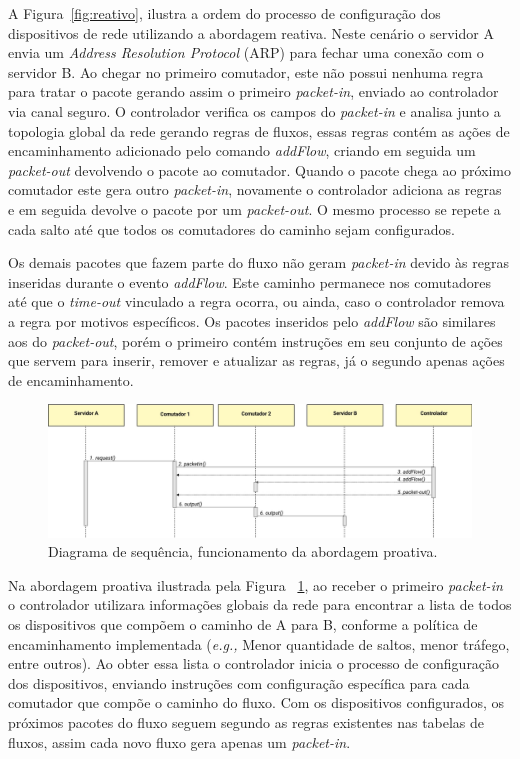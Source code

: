 A Figura~\ref{fig:reativo}, ilustra a ordem do processo de configuração dos dispositivos de rede utilizando a abordagem reativa. Neste cenário o servidor A envia um \emph{Address Resolution Protocol} (ARP) para fechar uma conexão com o servidor B. Ao chegar no primeiro comutador, este não possui nenhuma regra para tratar o pacote gerando assim o primeiro \textit{packet-in}, enviado ao controlador via canal seguro. O controlador verifica os campos do \textit{packet-in} e analisa junto a topologia global da rede gerando regras de fluxos, essas regras contém as ações de encaminhamento adicionado pelo comando \textit{addFlow}, criando em seguida um \textit{packet-out} devolvendo o pacote ao comutador. Quando o pacote chega ao próximo comutador este gera outro \textit{packet-in}, novamente o controlador adiciona as regras e em seguida devolve o pacote por um \textit{packet-out}. O mesmo processo se repete a cada salto até que todos os comutadores do caminho sejam configurados. 

Os demais pacotes que fazem parte do fluxo não geram \textit{packet-in} devido às regras inseridas durante o evento \textit{addFlow}. Este caminho permanece nos comutadores até que o \textit{time-out} vinculado a regra ocorra, ou ainda, caso o controlador remova a regra por motivos específicos. Os pacotes inseridos pelo \textit{addFlow} são similares aos do \textit{packet-out}, porém o primeiro contém instruções em seu conjunto de ações que servem para inserir, remover e atualizar as regras, já o segundo apenas ações de encaminhamento.
\begin{figure}[!htb]
	\caption{\label{fig:proativo}Diagrama de sequência, funcionamento da abordagem proativa.}
	\begin{center}
	    \includegraphics[scale=0.45]{imagens/Proativo.jpg}
	\end{center}
\end{figure}

Na abordagem proativa ilustrada pela Figura ~\ref{fig:proativo}, ao receber o primeiro \textit{packet-in} o controlador utilizara informações globais da rede para encontrar a lista de todos os dispositivos que compõem o caminho de A para B, conforme a política de encaminhamento implementada (\emph{e.g.,} Menor quantidade de saltos, menor tráfego, entre outros). Ao obter essa lista o controlador inicia o processo de configuração dos dispositivos, enviando instruções com configuração específica para cada comutador que compõe o caminho do fluxo. Com os dispositivos configurados, os próximos pacotes do fluxo seguem segundo as regras existentes nas tabelas de fluxos, assim cada novo fluxo gera apenas um \textit{packet-in}.


